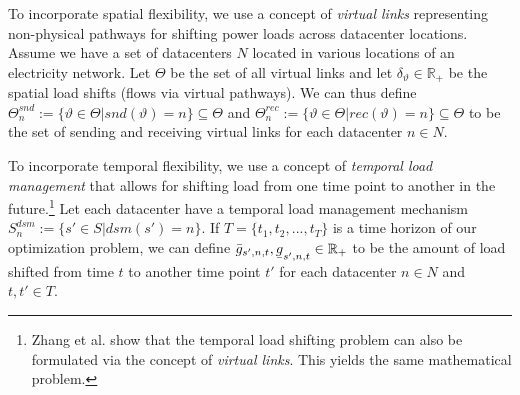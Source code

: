 
To incorporate spatial flexibility, we use a concept of \textit{virtual links} representing non-physical pathways for shifting power loads across datacenter locations. Assume we have a set of datacenters $N$ located in various locations of an electricity network. Let $\Theta$ be the set of all virtual links and let $\delta_\vartheta \in \mathbb{R}_{+}$ be the spatial load shifts (flows via virtual pathways). We can thus define $\Theta_n^{snd} := \{\vartheta \in \Theta | snd(\vartheta) = n\} \subseteq \Theta$ and $\Theta_n^{rec} := \{\vartheta \in \Theta | rec(\vartheta) = n\} \subseteq \Theta$ to be the set of sending and receiving virtual links for each datacenter $n \in N$.


To incorporate temporal flexibility, we use a concept of \textit{temporal load management} that allows for shifting load from one time point to another in the future.\footnote{Zhang et al. \cite{zhangRemuneratingSpaceTime2022} show that the temporal load shifting problem can also be formulated via the concept of \textit{virtual links}. This yields the same mathematical problem.} Let each datacenter have a temporal load management mechanism $S_n^{dsm} := \{s' \in S | dsm(s') = n\}$. If $T = \{t_1 , t_2 , ..., t_T\}$ is a time horizon of our optimization problem, we can define $\bar{g}_{s',n,t}, \ubar{g}_{s',n,t} \in \mathbb{R}_{+}$ to be the amount of load shifted from time $t$ to another time point $t'$ for each datacenter $n \in N$ and $t, t' \in T$.


